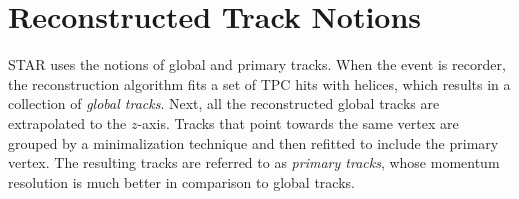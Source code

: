 \section{Reconstructed Track Notions}\label{section:star_track_labels}
STAR uses the notions of global and primary tracks. When the event is recorder, the reconstruction algorithm fits a set of TPC hits  with helices, which results in a collection of \textit{global tracks}. Next, all the reconstructed global tracks are extrapolated to the $z$-axis. Tracks that point towards the same vertex are grouped by a minimalization technique and then refitted to include the primary vertex. The resulting tracks are referred to as \textit{primary tracks}, whose momentum resolution is much better in comparison to global tracks.

